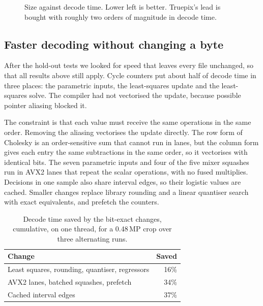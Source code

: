 \documentclass[10pt,twocolumn]{article}
\begin{document}
\begin{figure}[t]
\centering
{}
\caption{Size against decode time. Lower left is better. Truepix's lead is bought with roughly two orders of magnitude in decode time.}
\label{fig:speed}
\end{figure}

\subsection{Faster decoding without changing a byte}
\label{sec:faster}

After the hold-out tests we looked for speed that leaves every file unchanged, so that all results above still apply. Cycle counters put about half of decode time in three places: the parametric inputs, the least-squares update and the least-squares solve. The compiler had not vectorised the update, because possible pointer aliasing blocked it.

The constraint is that each value must receive the same operations in the same order. Removing the aliasing vectorises the update directly. The row form of Cholesky is an order-sensitive sum that cannot run in lanes, but the column form gives each entry the same subtractions in the same order, so it vectorises with identical bits. The seven parametric inputs and four of the five mixer squashes run in AVX2 lanes that repeat the scalar operations, with no fused multiplies. Decisions in one sample also share interval edges, so their logistic values are cached. Smaller changes replace library rounding and a linear quantiser search with exact equivalents, and prefetch the counters.

\begin{table}[t]
\centering\small
\caption{Decode time saved by the bit-exact changes, cumulative, on one thread, for a 0.48\,MP crop over three alternating runs.}
\label{tab:faster}
\begin{tabular}{@{}lr@{}}
\toprule
Change & Saved\\
\midrule
Least squares, rounding, quantiser, regressors & 16\%\\
AVX2 lanes, batched squashes, prefetch & 34\%\\
Cached interval edges & 37\%\\
\bottomrule
\end{tabular}
\end{table}
\end{document}

